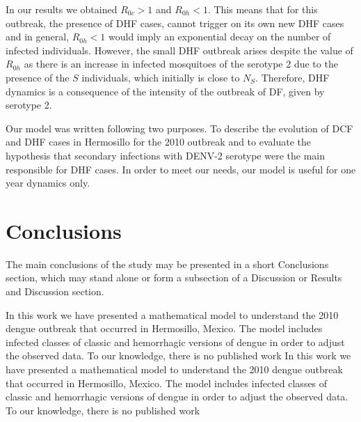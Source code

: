 \documentclass[draft, openbib]{imammb}
\numberwithin{equation}{section}
\begin{document}
        In our results we obtained $R_{0c}>1$ and  $R_{0h}<1$. This means
    that for this outbreak, the presence of DHF cases, cannot trigger
    on its own new DHF cases and in general, $R_{0h}<1$ would imply an
    exponential decay on the number of infected individuals. However,
    the small DHF outbreak arises despite the value of $R_{0h}$ as
    there is an increase in infected mosquitoes of the serotype 2 due
    to the presence of the $S$ individuals, which initially is close
    to $N_S$. Therefore, DHF dynamics is a consequence of the
    intensity of the outbreak of DF, given by serotype 2.

\noindent Our model was written following two purposes. To describe the evolution of DCF and DHF
cases in Hermosillo for the 2010 outbreak and to evaluate the hypothesis that secondary infections
with DENV-2 serotype were the main responsible for DHF cases. In order to meet our needs, our model is useful for one year dynamics only.



     

    \section{Conclusions}
        


        The main conclusions of the study may be presented in a 
    short Conclusions section, which may stand alone or form 
    a subsection of a Discussion or Results and Discussion 
    section.
    
	    In this work we have presented a mathematical model to understand the 2010 
    dengue outbreak that occurred in Hermosillo, Mexico. The model includes 
    infected classes of classic and hemorrhagic versions of dengue in order to 
    adjust the observed data. To our knowledge, there is no published work
        In this work we have presented a mathematical model to understand
    the 2010 dengue outbreak that occurred in Hermosillo, Mexico. The
    model includes infected classes of classic and hemorrhagic
    versions of dengue in order to adjust the observed data. To our
    knowledge, there is no published work
    
\end{document}
